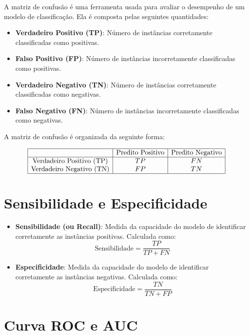 \documentclass{sciposter}
\begin{document}
\begin{multicols}{3}
A matriz de confusão é uma ferramenta usada para avaliar o desempenho de um modelo de classificação. Ela é composta pelas seguintes quantidades:

\begin{itemize}
    \item \textbf{Verdadeiro Positivo (TP)}: Número de instâncias corretamente classificadas como positivas.
    \item \textbf{Falso Positivo (FP)}: Número de instâncias incorretamente classificadas como positivas.
    \item \textbf{Verdadeiro Negativo (TN)}: Número de instâncias corretamente classificadas como negativas.
    \item \textbf{Falso Negativo (FN)}: Número de instâncias incorretamente classificadas como negativas.
\end{itemize}

A matriz de confusão é organizada da seguinte forma:

\[
\begin{array}{|c|c|c|}
\hline
 & \text{Predito Positivo} & \text{Predito Negativo} \\
\hline
\text{Verdadeiro Positivo (TP)} & TP & FN \\
\text{Verdadeiro Negativo (TN)} & FP & TN \\
\hline
\end{array}
\]

\section{Sensibilidade e Especificidade}

\begin{itemize}
    \item \textbf{Sensibilidade (ou Recall)}: Medida da capacidade do modelo de identificar corretamente as instâncias positivas. Calculada como:
    \[
    \text{Sensibilidade} = \frac{TP}{TP + FN}
    \]
    
    \item \textbf{Especificidade}: Medida da capacidade do modelo de identificar corretamente as instâncias negativas. Calculada como:
    \[
    \text{Especificidade} = \frac{TN}{TN + FP}
    \]
\end{itemize}

\section{Curva ROC e AUC}


\end{multicols}
\end{document}
